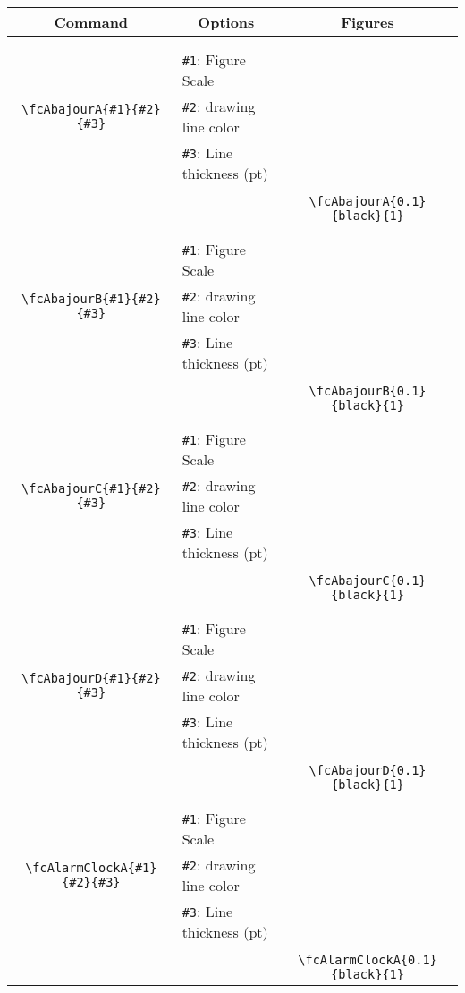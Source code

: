 \documentclass[x11names]{article}
\begin{document}
\begin{table}[H]\centering\begin{tabular}{|c|l|c|}\hline {\bf Command}& \multicolumn{1}{c|}{{\bf Options}} & {\bf Figures}\\  \hline	&&\multirow{5}{*}{\fcAbajourA{0.1}{black}{1}}\\	&&\\	&\verb|#1|: Figure Scale &\\	\verb|\fcAbajourA{#1}{#2}{#3}|&	\verb|#2|: drawing line color &\\	&\verb|#3|: Line thickness (pt) &\\ &&\\&&	\verb|\fcAbajourA{0.1}{black}{1}|\\\hline 	
	&&\multirow{5}{*}{\fcAbajourB{0.1}{black}{1}}\\	&&\\	&\verb|#1|: Figure Scale &\\	\verb|\fcAbajourB{#1}{#2}{#3}|&	\verb|#2|: drawing line color &\\	&\verb|#3|: Line thickness (pt) &\\ &&\\&&	\verb|\fcAbajourB{0.1}{black}{1}|\\\hline 	
	&&\multirow{5}{*}{\fcAbajourC{0.1}{black}{1}}\\	&&\\	&\verb|#1|: Figure Scale &\\	\verb|\fcAbajourC{#1}{#2}{#3}|&	\verb|#2|: drawing line color &\\	&\verb|#3|: Line thickness (pt) &\\ &&\\&&	\verb|\fcAbajourC{0.1}{black}{1}|\\\hline 	
	&&\multirow{5}{*}{\fcAbajourD{0.1}{black}{1}}\\	&&\\	&\verb|#1|: Figure Scale &\\	\verb|\fcAbajourD{#1}{#2}{#3}|&	\verb|#2|: drawing line color &\\	&\verb|#3|: Line thickness (pt) &\\ &&\\&&	\verb|\fcAbajourD{0.1}{black}{1}|\\\hline 	
	&&\multirow{5}{*}{\fcAlarmClockA{0.1}{black}{1}}\\	&&\\	&\verb|#1|: Figure Scale &\\	\verb|\fcAlarmClockA{#1}{#2}{#3}|&	\verb|#2|: drawing line color &\\	&\verb|#3|: Line thickness (pt) &\\ &&\\&&	\verb|\fcAlarmClockA{0.1}{black}{1}|\\\hline 	

\end{tabular}
\end{table}
\end{document}
